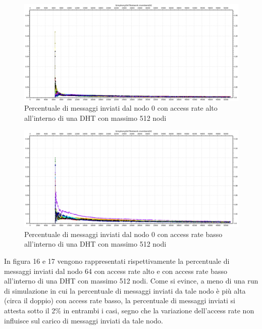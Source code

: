 \documentclass[	
	DIV=calc,
	paper=a4,
	fontsize=11pt,
	onecolumn
]{scrartcl} %
\begin{document}
	\begin{figure}[H]
		\centering
		\includegraphics[scale=0.35]	{SymphonyDHT/plots/PercentageOfMessagesSent/512_Nodes_FastAccess/SymphonyDHT_512Nodes_FastAccess_Node0.png}
		\caption{Percentuale di messaggi inviati dal nodo 0 con access rate alto all'interno di una DHT con massimo 512 nodi}
		\label{Figura 14}
	\end{figure}
	\begin{figure}[H]
		\centering
		\includegraphics[scale=0.35]	{SymphonyDHT/plots/PercentageOfMessagesSent/512_Nodes_SlowAccess/SymphonyDHT_512Nodes_SlowAccess_Node0.png}
		\caption{Percentuale di messaggi inviati dal nodo 0 con access rate basso all'interno di una DHT con massimo 512 nodi}
		\label{Figura 15}
	\end{figure}	
	
	In figura 16 e 17 vengono rappresentati rispettivamente la percentuale di messaggi inviati dal nodo 64 con access rate alto e con access rate basso all'interno di una DHT con massimo 512 nodi. Come si evince, a meno di una run di simulazione in cui la percentuale di messaggi inviati da tale nodo è più alta (circa il doppio) con access rate basso, la percentuale di messaggi inviati si attesta sotto il 2\% in entrambi i casi, segno che la variazione dell'access rate non influisce sul carico di messaggi inviati da tale nodo.
	
\end{document}
